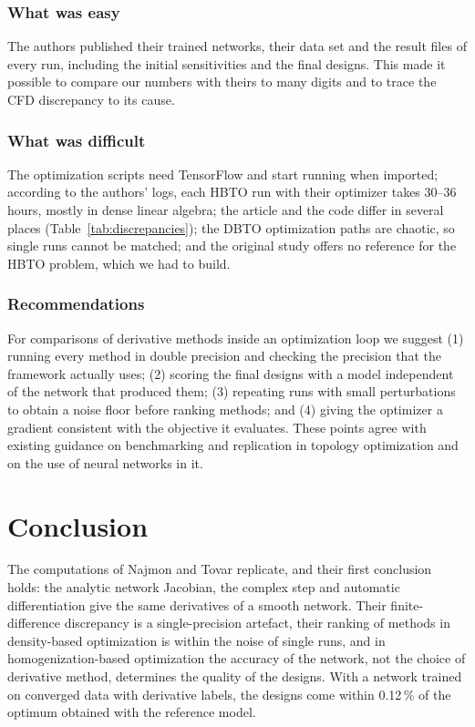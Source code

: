 \subsubsection{What was easy} The authors published their trained networks, their
data set and the result files of every run, including the initial
sensitivities and the final designs. This made it possible to compare our
numbers with theirs to many digits and to trace the CFD discrepancy to its
cause.

\subsubsection{What was difficult} The optimization scripts need TensorFlow and
start running when imported; according to the authors' logs, each HBTO run
with their optimizer takes 30--36 hours, mostly in dense linear algebra; the
article and the code differ in several places
(Table~\ref{tab:discrepancies}); the DBTO optimization paths are chaotic, so
single runs cannot be matched; and the original study offers no reference for
the HBTO problem, which we had to build.

\subsubsection{Recommendations} For comparisons of derivative methods inside an
optimization loop we suggest (1) running every method in double precision and
checking the precision that the framework actually uses; (2) scoring the final
designs with a model independent of the network that produced them;
(3) repeating runs with small perturbations to obtain a noise floor before
ranking methods; and (4) giving the optimizer a gradient consistent with the
objective it evaluates. These points agree with existing guidance on
benchmarking and replication in topology
optimization\supercite{Sigmund:2022,Haftka:2019} and on the use of neural
networks in it\supercite{Woldseth:2022}.

\section{Conclusion}
The computations of Najmon and Tovar\supercite{Najmon:2024} replicate, and
their first conclusion holds: the analytic network Jacobian, the complex step
and automatic differentiation give the same derivatives of a smooth network.
Their finite-difference discrepancy is a single-precision artefact, their
ranking of methods in density-based optimization is within the noise of single
runs, and in homogenization-based optimization the accuracy of the network,
not the choice of derivative method, determines the quality of the designs.
With a network trained on converged data with derivative labels, the designs
come within 0.12\,\% of the optimum obtained with the reference model.

